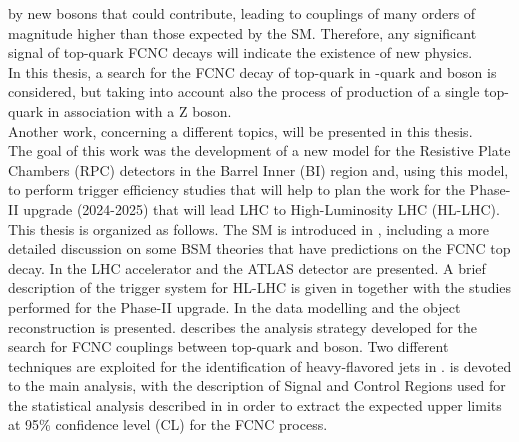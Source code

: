 by new bosons that could contribute, leading to couplings of many orders of magnitude higher
than those expected by the SM.
Therefore, any significant signal of top-quark FCNC decays will indicate the existence of new physics.
\vspace{\baselineskip}
\\In this thesis, a search for the FCNC decay of top-quark in \Pqc-quark and \PZ boson is 
considered, but taking into account also the process of production of a single top-quark in 
association with a Z boson.
\vspace{\baselineskip}
\\Another work, concerning a different topics, will be presented in this thesis. \\ 
The goal of this work was the development of a new model for the Resistive Plate Chambers (RPC) detectors in the Barrel Inner (BI) region and, using this model, to perform trigger efficiency studies that will help to plan the work for the Phase-II upgrade (2024-2025) that will lead LHC to High-Luminosity LHC (HL-LHC).
\vspace{\baselineskip}
\\This thesis is organized as follows. The SM is introduced in  , including a
more detailed discussion on some BSM theories that have predictions on the FCNC top decay. 
In  the LHC accelerator and the ATLAS detector are presented. 
A brief description of the trigger system for HL-LHC is given in  together with the studies performed for the Phase-II upgrade. 
In   the data modelling and the object reconstruction is presented.
 describes the analysis strategy developed for the search for FCNC couplings between top-quark and \PZ boson. Two different techniques are exploited  
for the identification of heavy-flavored jets in .   is devoted to the main analysis, with the description of Signal and Control Regions used for the statistical analysis described in  in order to extract the expected upper limits at 95\% confidence level (CL) for the FCNC \tZq process.
 
 